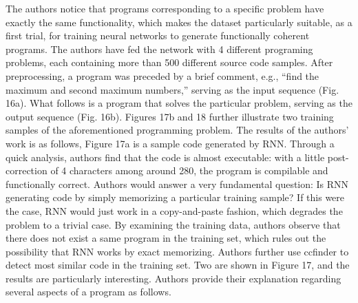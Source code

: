 \documentclass[conference, onecolumn, a4, 12pt]{IEEEtran}
\begin{document}
The authors notice that programs corresponding to a specific problem have exactly the same functionality, which makes the dataset particularly suitable, as a first trial, for training neural networks to generate functionally coherent programs.
The authors have fed the network with 4 different programing problems, each containing more than 500 different source code samples. After preprocessing, a program was preceded by a brief comment, e.g., “find the maximum and second maximum numbers,” serving as the input sequence (Fig. 16a). What follows is a program that solves the particular problem, serving as the output sequence (Fig. 16b). Figures 17b and 18 further illustrate two training samples of the aforementioned programming problem.
The results of the authors' work is as follows, Figure 17a is a sample code generated by RNN. Through a quick analysis, authors find that the code is almost executable: with a little post-correction of 4 characters among around 280, the program is compilable and functionally correct. Authors would answer a very fundamental question: Is RNN generating code by simply memorizing a particular training sample? If this were the case, RNN would just work in a copy-and-paste fashion, which degrades the problem to a trivial case.
By examining the training data, authors observe that there does not exist a same program in the training set, which rules out the possibility that RNN works by exact memorizing. Authors further use ccfinder \cite{a4} to detect most similar code in the training set. Two are shown in Figure 17, and the results are particularly interesting. Authors provide their explanation regarding several aspects of a program as follows.
\end{document}
